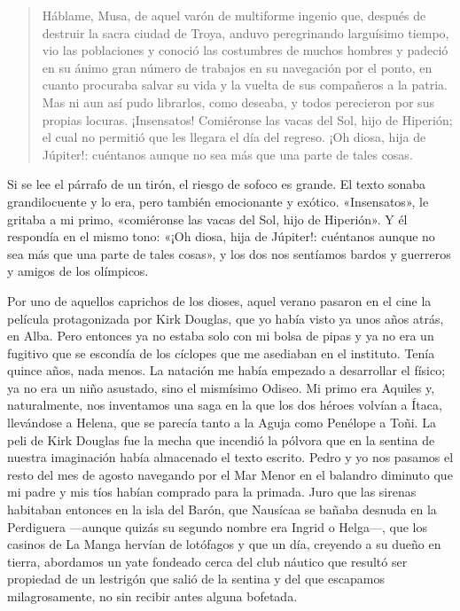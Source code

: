 \begin{quote}
\small
Háblame, Musa, de aquel varón de multiforme ingenio que, después de destruir la sacra ciudad de Troya, anduvo peregrinando larguísimo tiempo, vio las poblaciones y conoció las costumbres de muchos hombres y padeció en su ánimo gran número de trabajos en su navegación por el ponto, en cuanto procuraba salvar su vida y la vuelta de sus compañeros a la patria. Mas ni aun así pudo librarlos, como deseaba, y todos perecieron por sus propias locuras. ¡Insensatos! Comiéronse las vacas del Sol, hijo de Hiperión; el cual no permitió que les llegara el día del regreso. ¡Oh diosa, hija de Júpiter!: cuéntanos aunque no sea más que una parte de tales cosas.
\end{quote}

Si se lee el párrafo de un tirón, el riesgo de sofoco es grande. El texto sonaba grandilocuente y lo era, pero también emocionante y exótico. «Insensatos», le gritaba a mi primo, «comiéronse las vacas del Sol, hijo de Hiperión». Y él respondía en el mismo tono: «¡Oh diosa, hija de Júpiter!: cuéntanos aunque no sea más que una parte de tales cosas», y los dos nos sentíamos bardos y guerreros y amigos de los olímpicos.

Por uno de aquellos caprichos de los dioses, aquel verano pasaron en el cine la película protagonizada por Kirk Douglas, que yo había visto ya unos años atrás, en Alba. Pero entonces ya no estaba solo con mi bolsa de pipas y ya no era un fugitivo que se escondía de los cíclopes que me asediaban en el instituto. Tenía quince años, nada menos. La natación me había empezado a desarrollar el físico; ya no era un niño asustado, sino el mismísimo Odiseo. Mi primo era Aquiles y, naturalmente, nos inventamos una saga en la que los dos héroes volvían a Ítaca, llevándose a Helena, que se parecía tanto a la Aguja como Penélope a Toñi. La peli de Kirk Douglas fue la mecha que incendió la pólvora que en la sentina de nuestra imaginación había almacenado el texto escrito. Pedro y yo nos pasamos el resto del mes de agosto navegando por el Mar Menor en el balandro diminuto que mi padre y mis tíos habían comprado para la primada. Juro que las sirenas habitaban entonces en la isla del Barón, que Nausícaa se bañaba desnuda en la Perdiguera ---aunque quizás su segundo nombre era Ingrid o Helga---, que los casinos de La Manga hervían de lotófagos y que un día, creyendo a su dueño en tierra, abordamos un yate fondeado cerca del club náutico que resultó ser propiedad de un lestrigón que salió de la sentina y del que escapamos milagrosamente, no sin recibir antes alguna bofetada.

